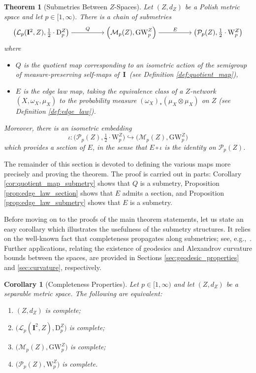 \documentclass{article}
\newtheorem{theorem}{Theorem}
\newtheorem{corollary}[proposition]{Corollary}
\theoremstyle{definition}
\newcommand{\M}{\mathcal{M}}
\newcommand{\MZp}{\M_p(Z)}
\newcommand{\dgwz}{\mathrm{GW}_p^Z}
\newcommand{\WZ}{\mathcal{P}_p(Z)}
\newcommand{\wz}{\mathrm{W}_p^Z}
\newcommand{\Lp}{\mathcal{L}_p}
\newcommand{\dpz}{\mathrm{D}^Z_p}
\begin{document}
\begin{theorem}[Submetries Between $Z$-Spaces]\label{thm:submetries_for_GW}
Let $(Z,d_Z)$ be a Polish metric space and let $p \in [1,\infty)$. There is a chain of submetries
\[\begin{tikzcd}[ampersand replacement=\&,cramped]
	{\left(\Lp(\mathbf{I}^2,Z), \frac{1}{2} \cdot \dpz\right)} \&\& {\left(\MZp,\dgwz\right)} \&\& {\left(\WZ,\frac{1}{2} \cdot \wz\right)}
	\arrow["Q", from=1-1, to=1-3]
	\arrow["E", from=1-3, to=1-5]
\end{tikzcd}\]
where 
\begin{itemize}
    \item $Q$ is the quotient map corresponding to an isometric action of the semigroup of measure-preserving self-maps of~$\mathbf{I}$~(see Definition \ref{def:quotient_map}), 
    \item $E$ is the edge law map, taking the equivalence class of a $Z$-network $(X,\omega_X,\mu_X)$ to the probability measure $(\omega_X)_\ast (\mu_X \otimes \mu_X)$ on $Z$ (see Definition \ref{def:edge_law}).
\end{itemize}
Moreover, there is an isometric embedding 
\[
\iota:\big(\WZ,\tfrac{1}{2} \cdot \wz\big) \hookrightarrow \big(\MZp,\dgwz\big)
\]
which provides a section of $E$, in the sense that $E \circ \iota$ is the identity on $\WZ$. 
\end{theorem}

The remainder of this section is devoted to defining the various maps more precisely and proving the theorem. The proof is carried out in parts: Corollary \ref{cor:quotient_map_submetry} shows that $Q$ is a submetry, Proposition \ref{prop:edge_law_section} shows that $E$ admits a section, and Proposition \ref{prop:edge_law_submetry} shows that $E$ is a submetry. 


Before moving on to the proofs of the main theorem statements, let us state an easy corollary which illustrates the usefulness of the submetry structures. It relies on the well-known fact that completeness propagates along submetries; see, e.g.,~\cite[Proposition 3.4]{alexander2024alexandrov}. Further applications, relating the existence of geodesics and Alexandrov curvature bounds between the spaces, are provided in Sections \ref{sec:geodesic_properties} and \ref{sec:curvature}, respectively.

\begin{corollary}[Completeness Properties]\label{cor:completeness_shared}
Let $p\in[1,\infty)$ and let $(Z,d_Z)$ be a separable metric space.
The following are equivalent:
\begin{enumerate}[label=(\arabic*)]
\item $(Z,d_Z)$ is complete;
\item $\bigl(\Lp(\mathbf{I}^2,Z),\dpz\bigr)$ is complete;
\item $\bigl(\MZp,\dgwz\bigr)$ is complete;
\item $\bigl(\WZ,\wz\bigr)$ is complete.
\end{enumerate}
\end{corollary}
\end{document}
